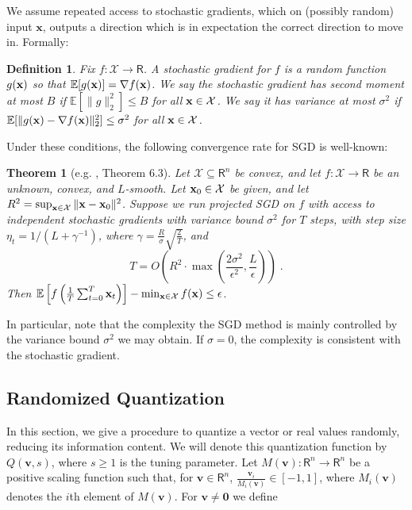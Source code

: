 \documentclass{article}
\newcommand{\R}{\mathsf{R}}
\renewcommand{\vec}[1]{\mathbf{#1}}
\def\x{{\bf x}}
\def\E{\mathbb{E}}
\newtheorem{theorem}{Theorem}
\newtheorem{definition}{Definition}
\begin{document}
We assume repeated access to stochastic gradients, which on (possibly random) input $\vec{x}$, outputs a direction which is in expectation the correct direction to move in.
Formally:
\begin{definition}
Fix $f: \mathcal{X} \to \R$.
A \emph{stochastic gradient} for $f$ is a random function $g (\x)$ so that $\E [g (\x) ] = \nabla f( \x)$.
We say the stochastic gradient has second moment at most $B$ if $\E [\| g \|_2^2] \leq B$ for all $\x \in \mathcal{X}$.
We say it has variance at most $\sigma^2$ if $\E [\| g (\x) - \nabla f(\x) \|_2^2] \leq \sigma^2$ for all $\x \in \mathcal{X}$. 
\end{definition}

Under these conditions, the following convergence rate for SGD is well-known:

\begin{theorem}[e.g. \cite{Bubeck15}, Theorem 6.3]
Let $\mathcal{X} \subseteq \R^n$ be convex, and let $f: \mathcal{X} \to \R$ be an unknown, convex, and $L$-smooth.
Let $\x_0 \in \mathcal{X}$ be given, and let $R^2 = \sup_{\x \in \mathcal{X}} \| \x - \x_0 \|^2$.
Suppose we run projected SGD on $f$ with access to independent stochastic gradients with variance bound $\sigma^2$ for $T$ steps, with step size $\eta_t = 1 / ( L + \gamma^{-1})$, where $\gamma = \frac{R}{\sigma} \sqrt{\frac{2}{T}}$, and
\begin{equation}
\label{eq:sgd-conv}
T = O \left( R^2 \cdot \max \left( \frac{2 \sigma^2}{\epsilon^2} , \frac{L}{\epsilon} \right) \right) \; .
\end{equation}
Then $\E \left[ f \left( \frac{1}{T} \sum_{t = 0}^T \x_t \right) \right] - \min_{\x \in \mathcal{X}} f(\x) \leq \epsilon$.
\end{theorem} 

In particular, note that the complexity the SGD method is mainly controlled by the variance bound $\sigma^2$ we may obtain. If $\sigma = 0$, the complexity is consistent with the stochastic gradient.


\subsection{Randomized Quantization}

In this section, we give a procedure to quantize a vector or real values randomly, reducing its information content. We will denote this quantization function by $Q(\vec{v},s)$, where $s\geq 1$ is the tuning parameter. 
Let $M(\vec{v}): \R^n \rightarrow \R^n$ be a positive scaling function such that, for $\vec{v}\in \R^n$, $\frac{\vec{v}_i}{M_i(\vec{v})} \in [-1, 1]$, where $M_i(\vec{v})$ denotes the $i$th element of $M(\vec{v})$.
For $\vec{v} \neq \vec{0}$ we define
\end{document}
